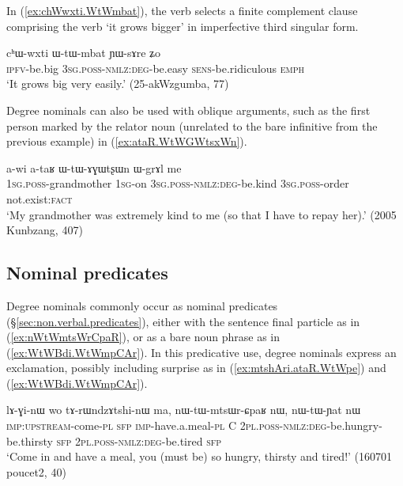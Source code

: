 In (\ref{ex:chWwxti.WtWmbat}), the verb  selects a finite complement clause comprising the verb  `it grows bigger' in imperfective third singular form.

\begin{exe}
\ex \label{ex:chWwxti.WtWmbat}
\gll cʰɯ-wxti ɯ-tɯ-mbat ɲɯ-sɤre ʑo \\
\textsc{ipfv}-be.big  \textsc{3sg}.\textsc{poss}-\textsc{nmlz}:\textsc{deg}-be.easy \textsc{sens}-be.ridiculous \textsc{emph} \\ 
\glt `It grows big very easily.' (25-akWzgumba, 77)
\end{exe}

Degree nominals can also be used with oblique arguments, such as the first person marked by the relator noun  (unrelated to the bare infinitive  from the previous example) in (\ref{ex:ataR.WtWGWtsxWn}).


\begin{exe}
\ex \label{ex:ataR.WtWGWtsxWn}
\gll a-wi a-taʁ ɯ-tɯ-ɤɣɯtʂɯn ɯ-grɤl me \\
\textsc{1sg}.\textsc{poss}-grandmother \textsc{1sg}-on \textsc{3sg}.\textsc{poss}-\textsc{nmlz}:\textsc{deg}-be.kind \textsc{3sg}.\textsc{poss}-order not.exist:\textsc{fact} \\
\glt `My grandmother was extremely kind to me (so that I have to repay her).' (2005 Kunbzang, 407)
\end{exe}


\subsection{Nominal predicates} \label{sec:degree.nominal.predicates}
Degree nominals commonly occur as nominal predicates (§\ref{sec:non.verbal.predicates}), either with the sentence final particle  as in (\ref{ex:nWtWmtsWrCpaR}), or as a bare noun phrase as in (\ref{ex:WtWBdi.WtWmpCAr}). In this predicative use, degree nominals express an exclamation, possibly including surprise as in (\ref{ex:mtshAri.ataR.WtWpe}) and (\ref{ex:WtWBdi.WtWmpCAr}).

\begin{exe}
\ex \label{ex:nWtWmtsWrCpaR}
\gll lɤ-ɣi-nɯ wo tɤ-rɯndzɤtshi-nɯ ma, nɯ-tɯ-mtsɯr-ɕpaʁ nɯ, nɯ-tɯ-ɲat nɯ\\
\textsc{imp}:\textsc{upstream}-come-\textsc{pl} \textsc{sfp} \textsc{imp}-have.a.meal-\textsc{pl} C \textsc{2pl}.\textsc{poss}-\textsc{nmlz}:\textsc{deg}-be.hungry-be.thirsty \textsc{sfp} \textsc{2pl}.\textsc{poss}-\textsc{nmlz}:\textsc{deg}-be.tired \textsc{sfp} \\
\glt `Come in and have a meal, you (must be) so hungry, thirsty and tired!' (160701 poucet2, 40)
\end{exe}

